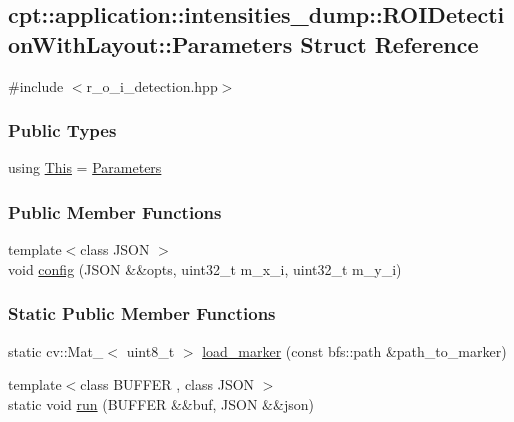 \hypertarget{structcpt_1_1application_1_1intensities__dump_1_1_r_o_i_detection_with_layout_1_1_parameters}{\subsection{cpt\-:\-:application\-:\-:intensities\-\_\-dump\-:\-:R\-O\-I\-Detection\-With\-Layout\-:\-:Parameters Struct Reference}
\label{structcpt_1_1application_1_1intensities__dump_1_1_r_o_i_detection_with_layout_1_1_parameters}
}


{\ttfamily \#include $<$r\-\_\-o\-\_\-i\-\_\-detection.\-hpp$>$}

\subsubsection*{Public Types}
\begin{DoxyCompactItemize}
\item 
using \hyperlink{structcpt_1_1application_1_1intensities__dump_1_1_r_o_i_detection_with_layout_1_1_parameters_ae6af99063a7e34900e8023d6f3ef4d53}{This} = \hyperlink{structcpt_1_1application_1_1intensities__dump_1_1_r_o_i_detection_with_layout_1_1_parameters}{Parameters}
\end{DoxyCompactItemize}
\subsubsection*{Public Member Functions}
\begin{DoxyCompactItemize}
\item 
{\footnotesize template$<$class J\-S\-O\-N $>$ }\\void \hyperlink{structcpt_1_1application_1_1intensities__dump_1_1_r_o_i_detection_with_layout_1_1_parameters_ae519fa11e05b2f5d3036fcaf9cc7888f}{config} (J\-S\-O\-N \&\&opts, uint32\-\_\-t m\-\_\-x\-\_\-i, uint32\-\_\-t m\-\_\-y\-\_\-i)
\end{DoxyCompactItemize}
\subsubsection*{Static Public Member Functions}
\begin{DoxyCompactItemize}
\item 
static cv\-::\-Mat\-\_\-$<$ uint8\-\_\-t $>$ \hyperlink{structcpt_1_1application_1_1intensities__dump_1_1_r_o_i_detection_with_layout_1_1_parameters_ad856bc51166ab10740f46e7351c9de07}{load\-\_\-marker} (const bfs\-::path \&path\-\_\-to\-\_\-marker)
\item 
{\footnotesize template$<$class B\-U\-F\-F\-E\-R , class J\-S\-O\-N $>$ }\\static void \hyperlink{structcpt_1_1application_1_1intensities__dump_1_1_r_o_i_detection_with_layout_1_1_parameters_ac4ac13fd195ee529ba2ce79de1c056f8}{run} (B\-U\-F\-F\-E\-R \&\&buf, J\-S\-O\-N \&\&json)
\end{DoxyCompactItemize}
